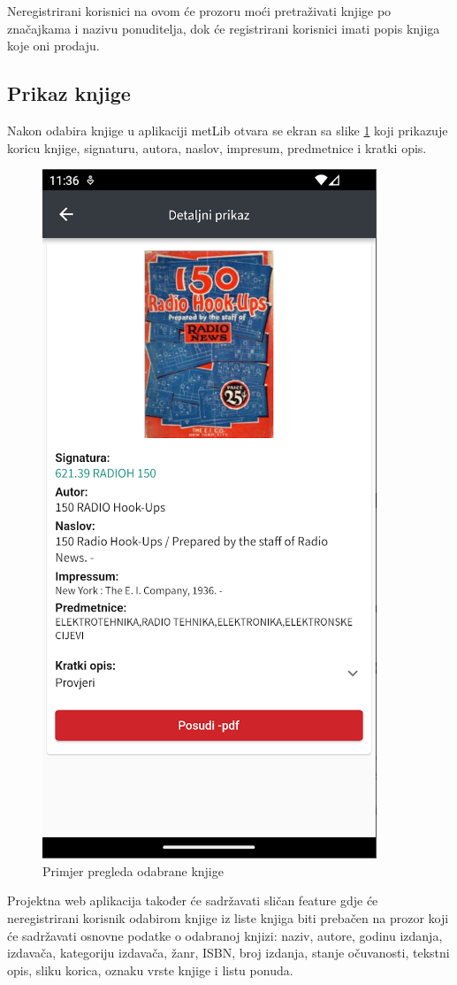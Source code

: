 	Neregistrirani korisnici na ovom će prozoru moći pretraživati knjige po značajkama i nazivu ponuditelja, dok će registrirani korisnici imati popis knjiga koje oni prodaju.
	
	\subsection{Prikaz knjige}
	
	Nakon odabira knjige u aplikaciji metLib otvara se ekran sa slike \ref{fig:prozor knjige} koji prikazuje koricu knjige, signaturu, autora, naslov, impresum, predmetnice i kratki opis. 
	
	\begin{figure}[H]
		\includegraphics[scale=0.4]{slike/BookScreen.PNG} %
		\centering
		\caption{Primjer pregleda odabrane knjige}
		\label{fig:prozor knjige}
	\end{figure}
		
	Projektna web aplikacija također će sadržavati sličan feature gdje će neregistrirani korisnik odabirom knjige iz liste knjiga biti prebačen na prozor koji će sadržavati osnovne podatke o odabranoj knjizi: naziv, autore, godinu izdanja, izdavača, kategoriju izdavača, žanr, ISBN, broj izdanja, stanje očuvanosti, tekstni opis, sliku korica, oznaku vrste knjige i listu ponuda.
	
		
	